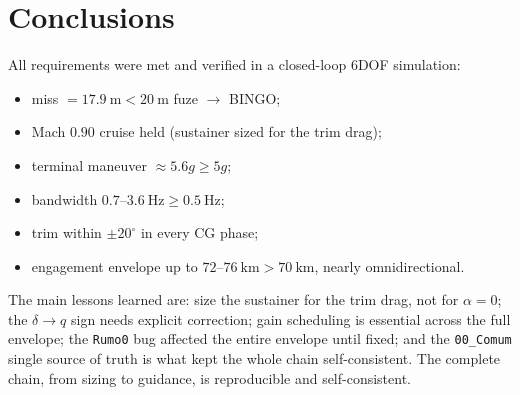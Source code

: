 \section{Conclusions}

All requirements were met and verified in a closed-loop 6DOF simulation:

\begin{itemize}
    \item miss $=17.9~\text{m}<20~\text{m}$ fuze $\rightarrow$ BINGO;
    \item Mach $0.90$ cruise held (sustainer sized for the trim drag);
    \item terminal maneuver $\approx 5.6g\geq 5g$;
    \item bandwidth $0.7$--$3.6~\text{Hz}\geq 0.5~\text{Hz}$;
    \item trim within $\pm 20^\circ$ in every CG phase;
    \item engagement envelope up to $72$--$76~\text{km}>70~\text{km}$, nearly omnidirectional.
\end{itemize}

The main lessons learned are: size the sustainer for the trim drag, not for $\alpha=0$; the $\delta\rightarrow q$ sign needs explicit correction; gain scheduling is essential across the full envelope; the \texttt{Rumo0} bug affected the entire envelope until fixed; and the \texttt{00\_Comum} single source of truth is what kept the whole chain self-consistent. The complete chain, from sizing to guidance, is reproducible and self-consistent.
